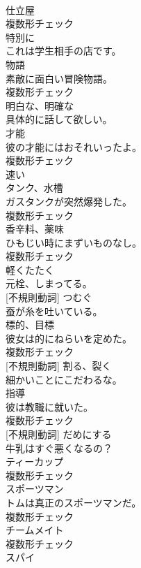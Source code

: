\documentclass[8pt]{extreport}
\begin{document}
\begin{CJK}{UTF8}{min}
\\	[名詞]	仕立屋	
\\	複数形チェック
\\	[副詞]	特別に	
\\	これは学生相手の店です。	
\\	[名詞]	物語	
\\	素敵に面白い冒険物語。	
\\	複数形チェック
\\	[形容詞]	明白な、明確な	
\\	具体的に話して欲しい。	
\\	[名詞]	才能	
\\	彼の才能にはおそれいったよ。	
\\	複数形チェック
\\	[形容詞]	速い	
\\	[名詞]	タンク、水槽	
\\	ガスタンクが突然爆発した。	
\\	複数形チェック
\\	[名詞]	香辛料、薬味	
\\	ひもじい時にまずいものなし。	
\\	複数形チェック
\\	[動詞]	軽くたたく	
\\	元栓、しまってる。	
\\	[動詞] [不規則動詞]	つむぐ	
\\	蚕が糸を吐いている。	
\\	[名詞]	標的、目標	
\\	彼女は的にねらいを定めた。	
\\	複数形チェック
\\	[動詞] [不規則動詞]	割る、裂く	
\\	細かいことにこだわるな。	
\\	[名詞]	指導	
\\	彼は教職に就いた。	
\\	複数形チェック
\\	[動詞] [不規則動詞]	だめにする	
\\	牛乳はすぐ悪くなるの？	
\\	[名詞]	ティーカップ	
\\	複数形チェック
\\	[名詞]	スポーツマン	
\\	トムは真正のスポーツマンだ。	
\\	複数形チェック
\\	[名詞]	チームメイト	
\\	複数形チェック
\\	[名詞]	スパイ	

\end{CJK}
\end{document}
